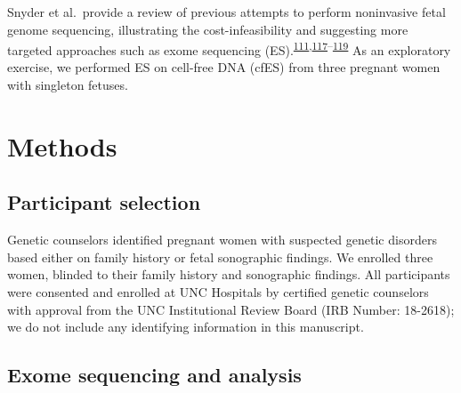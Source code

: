 \documentclass[11pt,letterpaper]{book}
\begin{document}
Snyder et al.~provide a review of previous attempts to perform noninvasive fetal genome sequencing, illustrating the cost-infeasibility and suggesting more targeted approaches such as exome sequencing (ES).\textsuperscript{\protect\hyperlink{ref-lo:2010aa}{111},\protect\hyperlink{ref-fan:2012aa}{117}--\protect\hyperlink{ref-snyder:2013aa}{119}}
As an exploratory exercise, we performed ES on cell-free DNA (cfES) from three pregnant women with singleton fetuses.

\hypertarget{methods-1}{%
\section{Methods}\label{methods-1}}

\hypertarget{participant-selection}{%
\subsection{Participant selection}\label{participant-selection}}

Genetic counselors identified pregnant women with suspected genetic disorders based either on family history or fetal sonographic findings.
We enrolled three women, blinded to their family history and sonographic findings.
All participants were consented and enrolled at UNC Hospitals by certified genetic counselors with approval from the UNC Institutional Review Board (IRB Number: 18-2618); we do not include any identifying information in this manuscript.

\hypertarget{exome-sequencing-and-analysis}{%
\subsection{Exome sequencing and analysis}\label{exome-sequencing-and-analysis}}
\end{document}
